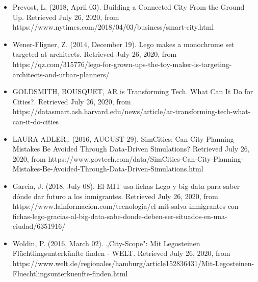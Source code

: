 \begin{itemize}
\item{Prevost, L. (2018, April 03). Building a Connected City From the Ground Up. Retrieved July 26, 2020, from https://www.nytimes.com/2018/04/03/business/smart-city.html}

\item{Wener-Fligner, Z. (2014, December 19). Lego makes a monochrome set targeted at architects. Retrieved July 26, 2020, from https://qz.com/315776/lego-for-grown-ups-the-toy-maker-is-targeting-architects-and-urban-planners/}

\item{GOLDSMITH, BOUSQUET, AR is Transforming Tech. What Can It Do for Cities?. Retrieved July 26, 2020, from https://datasmart.ash.harvard.edu/news/article/ar-transforming-tech-what-can-it-do-cities}

\item{LAURA ADLER,. (2016, AUGUST 29). SimCities: Can City Planning Mistakes Be Avoided Through Data-Driven Simulations? Retrieved July 26, 2020, from https://www.govtech.com/data/SimCities-Can-City-Planning-Mistakes-Be-Avoided-Through-Data-Driven-Simulations.html}

\item{Garcia, J. (2018, July 08). El MIT usa fichas Lego y big data para saber dónde dar futuro a los inmigrantes. Retrieved July 26, 2020, from https://www.lainformacion.com/tecnologia/el-mit-salva-inmigrantes-con-fichas-lego-gracias-al-big-data-sabe-donde-deben-ser-situados-en-una-ciudad/6351916/}

\item{Woldin, P. (2016, March 02). „City-Scope": Mit Legosteinen Flüchtlingsunterkünfte finden - WELT. Retrieved July 26, 2020, from https://www.welt.de/regionales/hamburg/article152836431/Mit-Legosteinen-Fluechtlingsunterkuenfte-finden.html}

\end{itemize}

\newpage